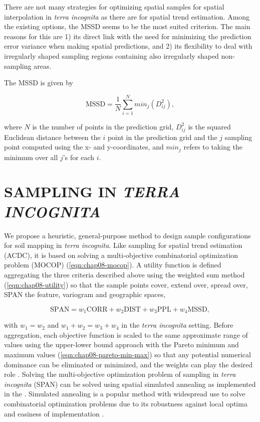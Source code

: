 There are not many strategies for optimizing spatial samples for spatial interpolation in \emph{terra 
incognita} as there are for spatial trend estimation. Among the existing options, the MSSD seems to be the most 
suited criterion. The main reasons for this are 1) its direct link with the need for minimizing the prediction 
error variance when making spatial predictions, and 2) its flexibility to deal with irregularly shaped sampling 
regions containing also irregularly shaped non-sampling areas.

The MSSD is given by

\begin{equation}%
 \text{MSSD} = \frac{1}{N} \sum_{i = 1}^{N} min_j(D_{ij}^2),
\end{equation}

\noindent where $N$ is the number of points in the prediction grid, $D_{ij}^2$ is the squared Euclidean 
distance between the $i$ point in the prediction grid and the $j$ sampling point computed using the x- and 
y-coordinates, and $min_j$ refers to taking the minimum over all $j$’s for each $i$.

\section{SAMPLING IN \emph{TERRA INCOGNITA}}

We propose a heuristic, general-purpose method to design sample configurations for soil mapping in \emph{terra 
incognita}. Like sampling for spatial trend estimation (ACDC), it is based on solving a multi-objective 
combinatorial optimization problem (MOCOP) (\autoref{eqn:chap08-mocop}). A utility function is defined 
aggregating the three criteria described above using the weighted sum method (\autoref{eqn:chap08-utility})
so that the sample points cover, extend over, spread over, SPAN the feature, variogram and geographic spaces,

\begin{equation} %
\text{SPAN} = w_1 \text{CORR} + w_2 \text{DIST} + w_3 \text{PPL} + w_4 \text{MSSD}, 
\end{equation}\label{eqn:chap08-span}

\noindent with $w_1 = w_2$ and $w_1 + w_2 = w_3 + w_4$ in the \emph{terra incognita} setting. Before 
aggregation, each objective function is scaled to the same approximate range of values using the upper-lower 
bound approach with the Pareto minimum and maximum values (\autoref{eqn:chap08-pareto-min-max}) so that any 
potential numerical dominance can be eliminated or minimized, and the weights can play the desired role 
\cite{MarlerEtAl2005, MarlerEtAl2009}. Solving the multi-objective optimization problem of sampling in 
\emph{terra incognita} (SPAN) can be solved using spatial simulated annealing as implemented in the 
. Simulated annealing is a popular method with widespread use to solve combinatorial 
optimization problems due to its robustness against local optima and easiness of implementation 
\cite{MetropolisEtAl1953, KirkpatrickEtAl1983, Cerny1985, AartsEtAl1989, Groenigen1999a}.

